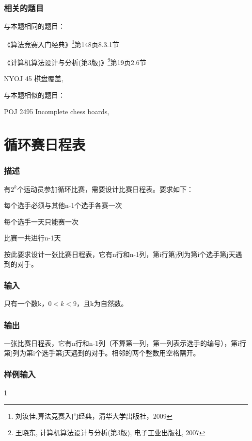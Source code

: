 \subsubsection{相关的题目}
与本题相同的题目：
\begindot
\item 《算法竞赛入门经典》\footnote{刘汝佳,算法竞赛入门经典，清华大学出版社，2009}第148页8.3.1节
\item 《计算机算法设计与分析(第3版)》\footnote{王晓东, 计算机算法设计与分析(第3版), 电子工业出版社, 2007}第19页2.6节
\item NYOJ 45 棋盘覆盖, 
\myenddot

与本题相似的题目：
\begindot
\item POJ 2495 Incomplete chess boards, 
\myenddot


\section{循环赛日程表} %
\subsubsection{描述}
有$2^k$个运动员参加循环比赛，需要设计比赛日程表。要求如下：

\begindot
\item 每个选手必须与其他n-1个选手各赛一次
\item 每个选手一天只能赛一次
\item 比赛一共进行n-1天
\myenddot

按此要求设计一张比赛日程表，它有n行和n-1列，第i行第j列为第i个选手第j天遇到的对手。

\subsubsection{输入}
只有一个数k，$0<k<9$，且k为自然数。

\subsubsection{输出}
一张比赛日程表，它有n行和n-1列（不算第一列，第一列表示选手的编号），第i行第j列为第i个选手第j天遇到的对手。相邻的两个整数用空格隔开。

\subsubsection{样例输入}
\begin{Code}
1
\end{Code}


